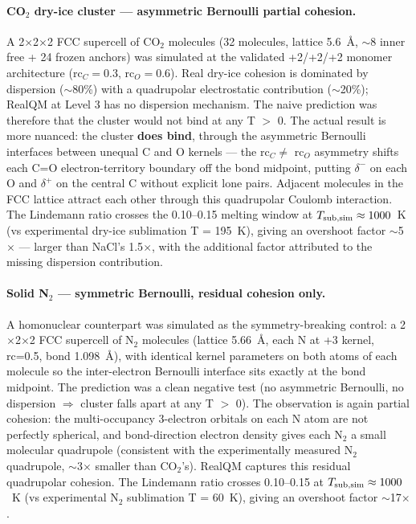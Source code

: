 \documentclass[11pt]{article}
\begin{document}
\paragraph{CO$_2$ dry-ice cluster --- asymmetric Bernoulli partial cohesion.}
A 2$\times$2$\times$2 FCC supercell of CO$_2$ molecules (32 molecules, lattice 5.6~\AA, $\sim$8 inner free + 24 frozen anchors) was simulated at the validated +2/+2/+2 monomer architecture (rc$_C = 0.3$, rc$_O = 0.6$). Real dry-ice cohesion is dominated by dispersion ($\sim$80\%) with a quadrupolar electrostatic contribution ($\sim$20\%); RealQM at Level 3 has no dispersion mechanism. The naive prediction was therefore that the cluster would not bind at any T $>$ 0. The actual result is more nuanced: the cluster \textbf{does bind}, through the asymmetric Bernoulli interfaces between unequal C and O kernels --- the rc$_C \neq$ rc$_O$ asymmetry shifts each C=O electron-territory boundary off the bond midpoint, putting $\delta^-$ on each O and $\delta^+$ on the central C without explicit lone pairs. Adjacent molecules in the FCC lattice attract each other through this quadrupolar Coulomb interaction. The Lindemann ratio crosses the 0.10--0.15 melting window at $T_{\rm sub,sim} \approx 1000$~K (vs experimental dry-ice sublimation T = 195~K), giving an overshoot factor $\sim$5$\times$ --- larger than NaCl's 1.5$\times$, with the additional factor attributed to the missing dispersion contribution.

\paragraph{Solid N$_2$ --- symmetric Bernoulli, residual cohesion only.}
A homonuclear counterpart was simulated as the symmetry-breaking control: a 2$\times$2$\times$2 FCC supercell of N$_2$ molecules (lattice 5.66~\AA, each N at +3 kernel, rc=0.5, bond 1.098~\AA), with identical kernel parameters on both atoms of each molecule so the inter-electron Bernoulli interface sits exactly at the bond midpoint. The prediction was a clean negative test (no asymmetric Bernoulli, no dispersion $\Rightarrow$ cluster falls apart at any T $>$ 0). The observation is again partial cohesion: the multi-occupancy 3-electron orbitals on each N atom are not perfectly spherical, and bond-direction electron density gives each N$_2$ a small molecular quadrupole (consistent with the experimentally measured N$_2$ quadrupole, $\sim$3$\times$ smaller than CO$_2$'s). RealQM captures this residual quadrupolar cohesion. The Lindemann ratio crosses 0.10--0.15 at $T_{\rm sub,sim} \approx 1000$~K (vs experimental N$_2$ sublimation T = 60~K), giving an overshoot factor $\sim$17$\times$.
\end{document}

